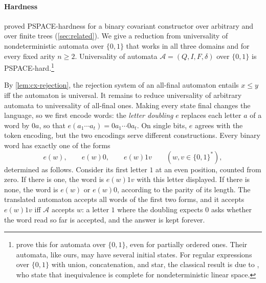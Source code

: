 \paragraph{Hardness}
 proved PSPACE-hardness for a binary
covariant constructor over arbitrary and over finite trees
(\cref{sec:related}). We give a reduction from universality of
nondeterministic automata over $\{0,1\}$ that works in all three domains and
for every fixed arity $n\ge2$. Universality of automata
$\mathcal A=(Q,I,F,\delta)$ over $\{0,1\}$ is PSPACE-hard.\footnote{%
\citet[Theorem~3]{KrotzschMasopustThomazo16} prove this for automata over
$\{0,1\}$, even for partially ordered ones. Their automata, like ours, may
have several initial states. For regular expressions over $\{0,1\}$ with
union, concatenation, and star, the classical result is due to
\citet[Section~3]{StockmeyerMeyer73}, who state that inequivalence is
complete for nondeterministic linear space.}

By \cref{lem:cx-rejection}, the rejection system of an all-final automaton
entails $x\le y$ iff the automaton is universal. It remains to reduce
universality of arbitrary automata to universality of all-final ones. Making
every state final changes the language, so we first encode words: the
\emph{letter doubling} $e$ replaces each letter $a$ of a word by $0a$, so
that $e(a_1\cdots a_t)=0a_1\cdots0a_t$. On single bits, $e$ agrees with the
token encoding, but the two encodings serve different constructions. Every
binary word has exactly one of the forms
\begin{equation}\label{eq:cx-forms}
 e(w),\qquad e(w)0,\qquad e(w)1v\qquad(w,v\in\{0,1\}^*),
\end{equation}
determined as follows. Consider its first letter $1$ at an even position, counted
from zero. If there is one, the word is $e(w)1v$ with this letter displayed.
If there is none, the word is $e(w)$ or $e(w)0$, according to the parity of
its length. The translated automaton accepts all words of the first two
forms, and it accepts $e(w)1v$ iff $\mathcal A$ accepts $w$: a letter $1$
where the doubling expects $0$ asks whether the word read so far is accepted,
and the answer is kept forever.

